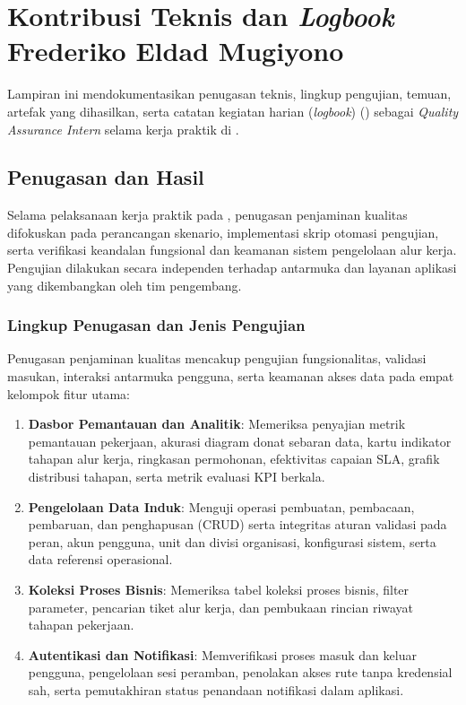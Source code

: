 \chapter{Kontribusi Teknis dan \textit{Logbook} Frederiko Eldad Mugiyono}\label{app:frederiko}
Lampiran ini mendokumentasikan penugasan teknis, lingkup pengujian, temuan, artefak yang dihasilkan, serta catatan kegiatan harian (\textit{logbook}) \NamaFrederiko{} (\NIMFrederiko) sebagai \textit{Quality Assurance Intern} selama kerja praktik di \TempatKP.

\section{Penugasan dan Hasil}
Selama pelaksanaan kerja praktik pada \PeriodeKP, penugasan penjaminan kualitas difokuskan pada perancangan skenario, implementasi skrip otomasi pengujian, serta verifikasi keandalan fungsional dan keamanan sistem pengelolaan alur kerja. Pengujian dilakukan secara independen terhadap antarmuka dan layanan aplikasi yang dikembangkan oleh tim pengembang.

\subsection*{Lingkup Penugasan dan Jenis Pengujian}
Penugasan penjaminan kualitas mencakup pengujian fungsionalitas, validasi masukan, interaksi antarmuka pengguna, serta keamanan akses data pada empat kelompok fitur utama:
\begin{enumerate}[label=\arabic*)]
\item \textbf{Dasbor Pemantauan dan Analitik}: Memeriksa penyajian metrik pemantauan pekerjaan, akurasi diagram donat sebaran data, kartu indikator tahapan alur kerja, ringkasan permohonan, efektivitas capaian SLA, grafik distribusi tahapan, serta metrik evaluasi KPI berkala.
\item \textbf{Pengelolaan Data Induk}: Menguji operasi pembuatan, pembacaan, pembaruan, dan penghapusan (CRUD) serta integritas aturan validasi pada peran, akun pengguna, unit dan divisi organisasi, konfigurasi sistem, serta data referensi operasional.
\item \textbf{Koleksi Proses Bisnis}: Memeriksa tabel koleksi proses bisnis, filter parameter, pencarian tiket alur kerja, dan pembukaan rincian riwayat tahapan pekerjaan.
\item \textbf{Autentikasi dan Notifikasi}: Memverifikasi proses masuk dan keluar pengguna, pengelolaan sesi peramban, penolakan akses rute tanpa kredensial sah, serta pemutakhiran status penandaan notifikasi dalam aplikasi.
\end{enumerate}


